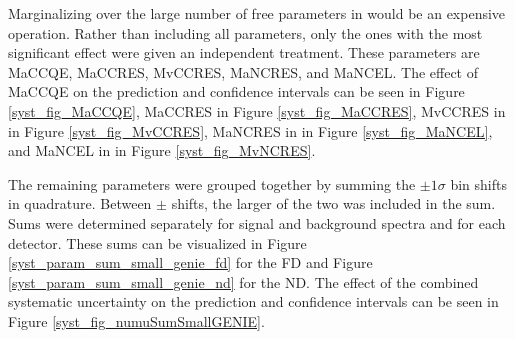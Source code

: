 {Marginalizing over the large number of free parameters in \genie
would be an expensive operation.
Rather than including all parameters, only the ones
with the most significant effect were given an independent treatment.
These parameters are MaCCQE, MaCCRES, MvCCRES, MaNCRES, and MaNCEL.
The effect of MaCCQE on the prediction and confidence intervals
can be seen in Figure \ref{syst_fig_MaCCQE},
MaCCRES in Figure \ref{syst_fig_MaCCRES},
MvCCRES in in Figure \ref{syst_fig_MvCCRES},
MaNCRES in in Figure \ref{syst_fig_MaNCEL},
and MaNCEL in in Figure \ref{syst_fig_MvNCRES}.

The remaining parameters were grouped together by summing the
$\pm1\sigma$  bin shifts in quadrature.
Between $\pm$ shifts, the larger of the two was included in the sum.
Sums were determined separately for signal and background spectra and
for each detector.
These sums can be visualized in Figure \ref{syst_param_sum_small_genie_fd} for
the FD and Figure \ref{syst_param_sum_small_genie_nd} for the ND.
The effect of the combined systematic uncertainty on the
prediction and confidence intervals can be seen in Figure
\ref{syst_fig_numuSumSmallGENIE}.


}
